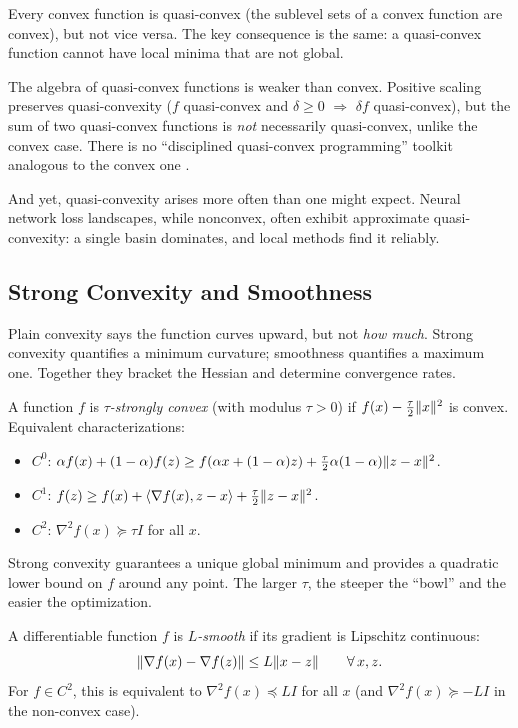 Every convex function is quasi-convex (the sublevel sets of a convex function are convex), but not vice versa.
The key consequence is the same: a quasi-convex function cannot have local minima that are not global.

The algebra of quasi-convex functions is weaker than convex.
Positive scaling preserves quasi-convexity ($f$ quasi-convex and $\delta \geq 0$ $\Rightarrow$ $\delta f$ quasi-convex), but the sum of two quasi-convex functions is \emph{not} necessarily quasi-convex, unlike the convex case.
There is no ``disciplined quasi-convex programming'' toolkit analogous to the convex one \cite{boyd2008}.

And yet, quasi-convexity arises more often than one might expect.
Neural network loss landscapes, while nonconvex, often exhibit approximate quasi-convexity: a single basin dominates, and local methods find it reliably.


\subsection{Strong Convexity and Smoothness}\label{sec:strong-convex}

Plain convexity says the function curves upward, but not \emph{how much}.
Strong convexity quantifies a minimum curvature; smoothness quantifies a maximum one.
Together they bracket the Hessian and determine convergence rates.

\begin{definition}\label{def:strong-convex}
	A function $f$ is \emph{$\tau$-strongly convex} (with modulus $\tau > 0$) if $f(x) - \frac{\tau}{2}\lVert x\rVert^2$ is convex.
	Equivalent characterizations:
	\begin{itemize}
		\item $C^0$: $\alpha f(x) + (1 - \alpha)f(z) \geq f(\alpha x + (1 - \alpha)z) + \frac{\tau}{2}\alpha(1 - \alpha)\lVert z - x\rVert^2$.
		\item $C^1$: $f(z) \geq f(x) + \langle\nabla f(x), z - x\rangle + \frac{\tau}{2}\lVert z - x\rVert^2$.
		\item $C^2$: $\nabla^2 f(x) \succeq \tau I$ for all $x$.
	\end{itemize}
\end{definition}

Strong convexity guarantees a unique global minimum and provides a quadratic lower bound on $f$ around any point.
The larger $\tau$, the steeper the ``bowl'' and the easier the optimization.

\begin{definition}[$L$-smoothness]\label{def:L-smooth}
	A differentiable function $f$ is \emph{$L$-smooth} if its gradient is Lipschitz continuous:
	\begin{equation}\label{eq:L-smoothness}
		\lVert\nabla f(x) - \nabla f(z)\rVert \leq L\lVert x - z\rVert \qquad \forall\, x, z.
	\end{equation}
	For $f \in C^2$, this is equivalent to $\nabla^2 f(x) \preceq LI$ for all $x$ (and $\nabla^2 f(x) \succeq -LI$ in the non-convex case).
\end{definition}

